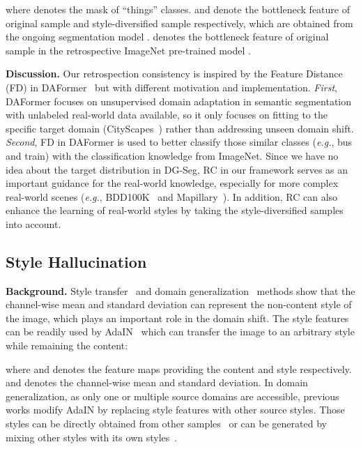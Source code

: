 \documentclass[runningheads]{llncs}
\def\eg{\emph{e.g.}} \def\Eg{\emph{E.g.}}
\begin{document}
where  denotes the mask of ``things'' classes.  and  denote the bottleneck feature of original sample  and style-diversified sample  respectively, which are obtained from the ongoing segmentation model .  denotes the bottleneck feature of original sample  in the retrospective ImageNet pre-trained model . 


\noindent\textbf{Discussion.} Our retrospection consistency is inspired by the Feature Distance (FD) in DAFormer~\cite{hoyer2021daformer} but with different motivation and implementation. \textit{First}, DAFormer focuses on unsupervised domain adaptation in semantic segmentation with unlabeled real-world data available, so it only focuses on fitting to the specific target domain (CityScapes~\cite{cityscapes}) rather than addressing unseen domain shift. \textit{Second}, FD in DAFormer is used to better classify those similar classes (\eg, bus and train) with the classification knowledge from ImageNet. Since we have no idea about the target distribution in DG-Seg, RC in our framework serves as an important guidance for the real-world knowledge, especially for more complex real-world scenes (\textit{e.g.}, BDD100K~\cite{bdd} and Mapillary~\cite{mapillary}). 
In addition, RC can also enhance the learning of real-world styles by taking the style-diversified samples into account.



\subsection{Style Hallucination}
\label{sec:sh}
\noindent\textbf{Background.} Style transfer~\cite{chen2021diverse,adain} and domain generalization~\cite{crossnorm,zhou2021mixstyle} methods show that the channel-wise mean and standard deviation can represent the non-content style of the image, which plays an important role in the domain shift. The style features can be readily used by AdaIN~\cite{adain} which can transfer the image to an arbitrary style while remaining the content:

where  and  denotes the feature maps providing the content and style respectively.  and  denotes the channel-wise mean and standard deviation. In domain generalization, as only one or multiple source domains are accessible, previous works modify AdaIN by replacing style features with other source styles. Those styles can be directly obtained from other samples~\cite{crossnorm} or can be generated by mixing other styles with its own styles~\cite{zhou2021mixstyle}.
\end{document}
